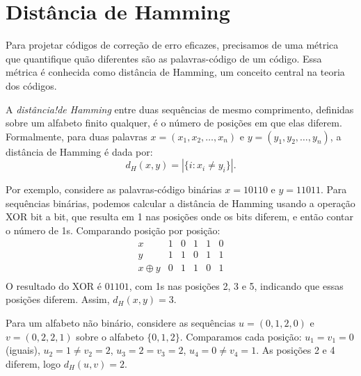 \section{Distância de Hamming}

Para projetar códigos de correção de erro eficazes, precisamos de uma métrica
que quantifique quão diferentes são as palavras-código de um código. Essa
métrica é conhecida como distância de Hamming, um conceito central na
teoria dos códigos.

\begin{definition}
A \emph{distância!de Hamming} entre duas sequências de mesmo comprimento, definidas 
sobre um alfabeto finito qualquer, é o número de
posições em que elas diferem. Formalmente, para duas palavras 
$x = (x_1, x_2, \dots, x_n)$ e $y = (y_1, y_2, \dots, y_n)$, a distância de Hamming é
dada por:
\begin{equation}
d_H(x, y) = |\{ i : x_i \neq y_i \}|.
\end{equation}
\end{definition}


\begin{example}
Por exemplo, considere as palavras-código binárias $x = 10110$ e 
$y = 11011$. Para sequências binárias, podemos calcular a distância de Hamming
usando a operação XOR bit a bit, que resulta em 1 nas posições onde os bits
diferem, e então contar o número de 1s. Comparando posição por posição:
\[
\begin{array}{r|ccccc}
x & 1 & 0 & 1 & 1 & 0 \\
y & 1 & 1 & 0 & 1 & 1 \\
\hline
x \oplus y & 0 & 1 & 1 & 0 & 1 \\
\end{array}
\]
O resultado do XOR é $01101$, com 1s nas posições 2, 3 e 5, 
indicando que essas posições diferem. Assim, $d_H(x, y) = 3$.
\end{example}


\begin{example}
Para um alfabeto não binário, considere as sequências $u = (0, 1, 2, 0)$ e
$v = (0, 2, 2, 1)$ sobre o alfabeto $\{0, 1, 2\}$. Comparamos cada posição: 
$u_1 = v_1 = 0$ (iguais), $u_2 = 1 \neq v_2 = 2$, $u_3 = 2 = v_3 = 2$, 
$u_4 = 0 \neq v_4 = 1$. As posições 2 e 4 diferem, logo $d_H(u, v) = 2$.
\end{example}




